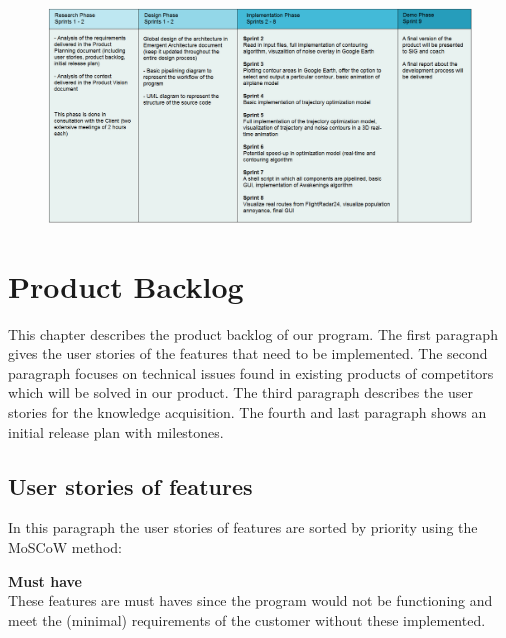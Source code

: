 ﻿\documentclass[a4paper,english,fleqn]{exam}
\begin{document}
\begin{figure}[ht]
    \centering
    \includegraphics[width=1.1\textwidth]{roadmap}
\end{figure}

\newpage

\section{Product Backlog}

This chapter describes the product backlog of our program. The first paragraph gives the user stories of the features that need to be implemented. The second paragraph focuses on technical issues found in existing products of competitors which will be solved in our product. The third paragraph describes the user stories for the knowledge acquisition. The fourth and last paragraph shows an initial release plan with milestones. 

\subsection{User stories of features}
In this paragraph the user stories of features are sorted by priority using the MoSCoW method:

\textbf{Must have} \\ 
These features are must haves since the program would not be functioning and meet the (minimal) requirements of the customer without these implemented. 
\end{document}
